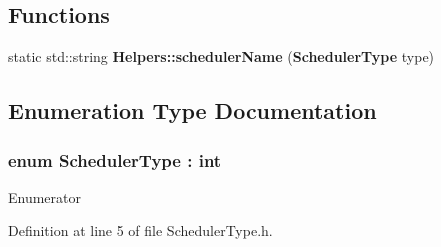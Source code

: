 \subsection*{Functions}
\begin{DoxyCompactItemize}
\item 
static std\+::string {\bf Helpers\+::scheduler\+Name} ({\bf Scheduler\+Type} type)
\end{DoxyCompactItemize}


\subsection{Enumeration Type Documentation}
\subsubsection[{Scheduler\+Type}]{\setlength{\rightskip}{0pt plus 5cm}enum {\bf Scheduler\+Type} \+: int\hspace{0.3cm}{\ttfamily [strong]}}\label{_scheduler_type_8h_a38e49b4d2a59c90c891c884c009e9135}
\begin{Desc}
\item[Enumerator]\par
\begin{description}
\item[{\em 
Simple\label{_scheduler_type_8h_a38e49b4d2a59c90c891c884c009e9135a1fbb1e3943c2c6c560247ac8f9289780}
}]\item[{\em 
Planning\label{_scheduler_type_8h_a38e49b4d2a59c90c891c884c009e9135a21d28aa03f67eb242b1c95a6a0594ff5}
}]\end{description}
\end{Desc}


Definition at line 5 of file Scheduler\+Type.\+h.

